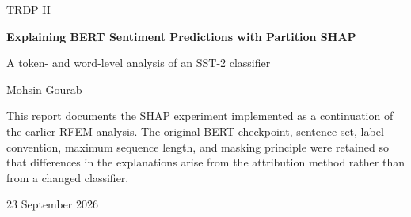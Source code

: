 \documentclass[11pt,a4paper]{article}
\begin{document}
\hypersetup{pageanchor=false}
\begin{titlepage}
  \centering
  \vspace*{24mm}
  {\Large TRDP II\par}
  \vspace{16mm}
  {\huge\bfseries Explaining BERT Sentiment Predictions with Partition SHAP\par}
  \vspace{6mm}
  {\Large A token- and word-level analysis of an SST-2 classifier\par}
  \vspace{24mm}
  {\large Mohsin Gourab\par}
  \vfill
  \begin{minipage}{0.82\textwidth}
    \small
    This report documents the SHAP experiment implemented as a continuation of
    the earlier RFEM analysis. The original BERT checkpoint, sentence set, label
    convention, maximum sequence length, and masking principle were retained so
    that differences in the explanations arise from the attribution method rather
    than from a changed classifier.
  \end{minipage}
  \vfill
  {\large 23 September 2026\par}
\end{titlepage}

\hypersetup{pageanchor=true}
\begin{abstract}
This study applies Partition SHAP to a BERT classifier fine-tuned for binary
sentiment analysis. The experiment was motivated by the failure of an earlier
attention-based recursive feature elimination procedure to retain several
semantically important words. The classifier output explained here is the
difference between the positive and negative logits. A SHAP text masker creates
coalitions of available and unavailable tokenizer features; unavailable features
are represented by BERT's \texttt{[MASK]} token, and every perturbed sentence is
evaluated by the unchanged classifier. Token-level contributions are subsequently
aggregated over BERT WordPieces to obtain readable word-level explanations.

The evaluation used ten qualitative sentences carried over from the previous
experiment. The model classified all \ResultSentenceCount{} sentences correctly.
For every sentence, the SHAP base value plus the sum of the feature attributions
reconstructed the model margin, with a maximum stored additivity residual of
\(\ResultMaxResidual\). Masking the highest-ranked decision-supporting words
produced a mean comprehensiveness drop of \ResultMeanComp, while retaining only
those words produced a mean sufficiency gap of \ResultMeanSuff. The explanations
recover clear sentiment cues such as \emph{beautiful}, \emph{outstanding},
\emph{boring}, \emph{weak}, and \emph{captivating}. They also expose interaction-
dependent assignments that should not be read as context-free lexical sentiment.
\end{abstract}
\end{document}
